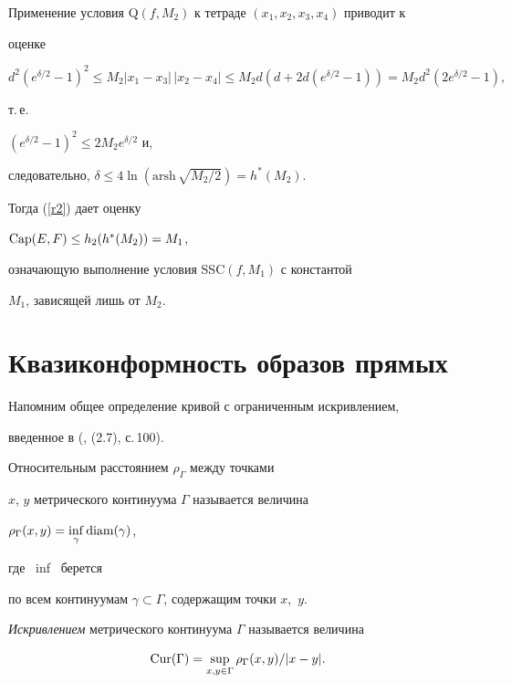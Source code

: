 \begin{pf}
Применение условия Q$(f, M_2)$ к тетраде $(x_1, x_2, x_3, x_4)$ приводит к 


оценке


$$


d^2( e^{\delta/2} -1)^2 \leq M_2 |x_1 - x_3|\, |x_2 - x_4| 


\leq M_2 d(d+ 2d(e^{\delta /2}-1)) = M_2 d^2 (2e^{\delta/2} -1),


$$


т.\,е.


$(e^{\delta/2} -1)^2 \leq 2M_2e^{\delta/2}$ и,


следовательно, $\delta \leq 4\ln(\mathrm{arsh}\,\sqrt{M_2/2}) = h^{*}(M_2)$. 


Тогда (\ref{r2}) дает оценку


$\operatorname{Cap}(E,F) \leq h_2(h^{*}(M_2)) = M_1$,


означающую выполнение условия SSC$(f, M_1)$ с константой 


$M_1$, зависящей лишь от $M_2$.


\end{pf}





\section{Квазиконформность образов прямых}





Напомним общее определение кривой с ограниченным искривлением, 


введенное в (\cite{TV}, (2.7), с.\,100).





\begin{defns}


Относительным расстоянием $\rho_{\Gamma}$ между точками 


$x$, $y$ метрического континуума $\Gamma$ называется величина 


$ \rho_{\Gamma }(x,y) = \inf\limits_{\gamma} \operatorname{diam}(\gamma)$,


где \ inf \ берется 


по всем континуумам $\gamma \subset \Gamma$, содержащим точки $x$,~$y$. 


{\it Искривлением} метрического континуума $\Gamma$ называется величина 


$$


\Cur(\Gamma) = \sup_{x,y\in \Gamma} \rho_{\Gamma} (x,y)/|x-y|.


$$


\end{defns}






